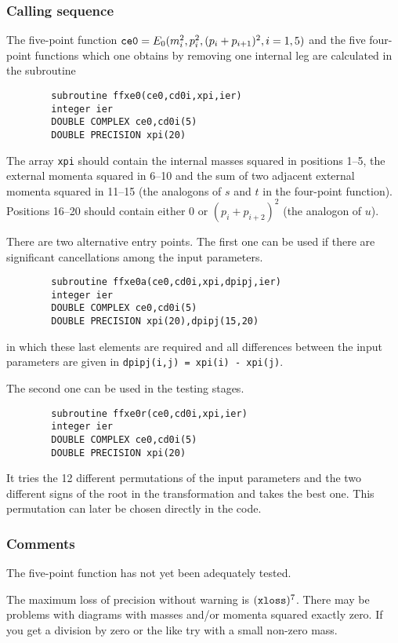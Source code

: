 \subsubsection{Calling sequence}

The five-point function $\mbox{\tt ce0} = E_0(m_i^2,p_i^2,(p_i+p_{i+1})^2,i=1,
5)$ and the five four-point functions which one obtains by removing one 
internal leg are calculated in the subroutine
\begin{verbatim}
        subroutine ffxe0(ce0,cd0i,xpi,ier)  
        integer ier
        DOUBLE COMPLEX ce0,cd0i(5)
        DOUBLE PRECISION xpi(20)
\end{verbatim}
The array {\tt xpi} should contain the internal masses squared in positions 
1--5, the external momenta squared in 6--10 and the sum of two adjacent 
external momenta squared in 11--15 (the analogons of $s$ and $t$ in the 
four-point function).  Positions 16--20 should contain either 0 or 
$(p_i+p_{i+2})^2$ (the analogon of $u$).

There are two alternative entry points.  The first one can be used if there 
are significant cancellations among the input parameters.
\begin{verbatim}
        subroutine ffxe0a(ce0,cd0i,xpi,dpipj,ier)
        integer ier
        DOUBLE COMPLEX ce0,cd0i(5)
        DOUBLE PRECISION xpi(20),dpipj(15,20)
\end{verbatim}
in which these last elements are required and all differences between the 
input parameters are given in {\tt dpipj(i,j) = xpi(i) - xpi(j)}.

The second one can be used in the testing stages.  
\begin{verbatim}
        subroutine ffxe0r(ce0,cd0i,xpi,ier)
        integer ier
        DOUBLE COMPLEX ce0,cd0i(5)
        DOUBLE PRECISION xpi(20)
\end{verbatim}
It tries the 12 different permutations of the input parameters and the two 
different signs of the root in the transformation and takes the best one.  
This permutation can later be chosen directly in the code.

\subsubsection{Comments}

The five-point function has not yet been adequately tested.

The maximum loss of precision without warning is $(\mbox{\tt xloss})^7$.  
There may be problems with diagrams with masses and/or momenta squared 
exactly zero.  If you get a division by zero or the like try with a 
small non-zero mass.

